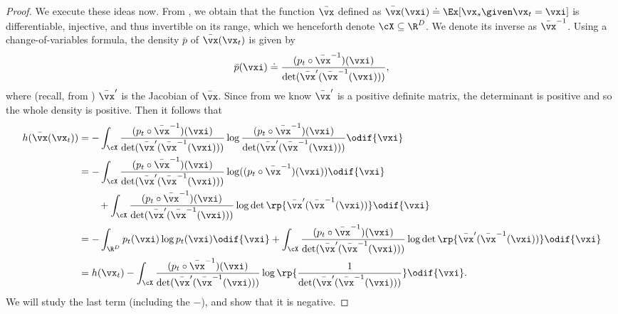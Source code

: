 \documentclass[../../book-main.tex]{subfiles}
\begin{document}
\begin{proof}
    We execute these ideas now. From , we obtain that the function \(\bar{\vx}\) defined as \(\bar{\vx}(\vxi) \doteq \Ex[\vx_{s} \given \vx_{t} = \vxi]\) is differentiable, injective, and thus invertible on its range, which we henceforth denote \(\cX \subseteq \R^{D}\). We denote its inverse as \(\bar{\vx}^{-1}\). Using a change-of-variables formula, the density \(\bar{p}\) of \(\bar{\vx}(\vx_{t})\) is given by 
    \begin{equation}
        \bar{p}(\vxi) \doteq \frac{(p_{t} \circ \bar{\vx}^{-1})(\vxi)}{\det(\bar{\vx}^{\prime}(\bar{\vx}^{-1}(\vxi)))},
    \end{equation}
    where (recall, from ) \(\bar{\vx}^{\prime}\) is the Jacobian of \(\bar{\vx}\). Since from  we know \(\bar{\vx}^{\prime}\) is a positive definite matrix, the determinant is positive and so the whole density is positive. Then it follows that 
    \begin{align}
        h(\bar{\vx}(\vx_{t}))
        &= -\int_{\cX}\frac{(p_{t} \circ \bar{\vx}^{-1})(\vxi)}{\det(\bar{\vx}^{\prime}(\bar{\vx}^{-1}(\vxi)))} \log \frac{(p_{t} \circ \bar{\vx}^{-1})(\vxi)}{\det(\bar{\vx}^{\prime}(\bar{\vx}^{-1}(\vxi)))} \odif{\vxi} \\ 
        &= -\int_{\cX}\frac{(p_{t} \circ \bar{\vx}^{-1})(\vxi)}{\det(\bar{\vx}^{\prime}(\bar{\vx}^{-1}(\vxi)))} \log((p_{t} \circ \bar{\vx}^{-1})(\vxi))\odif{\vxi} \\ 
        &\qquad + \int_{\cX}\frac{(p_{t} \circ
        \bar{\vx}^{-1})(\vxi)}{\det(\bar{\vx}^{\prime}(\bar{\vx}^{-1}(\vxi)))}\log\det\rp{\bar{\vx}^{\prime}(\bar{\vx}^{-1}(\vxi))}\odif{\vxi} \\ 
        &= -\int_{\R^{D}}p_{t}(\vxi)\log p_{t}(\vxi)\odif{\vxi}
        + \int_{\cX}\frac{(p_{t} \circ
        \bar{\vx}^{-1})(\vxi)}{\det(\bar{\vx}^{\prime}(\bar{\vx}^{-1}(\vxi)))}\log\det\rp{\bar{\vx}^{\prime}(\bar{\vx}^{-1}(\vxi))}\odif{\vxi} \\ 
        &= h(\vx_{t}) - \int_{\cX}\frac{(p_{t} \circ \bar{\vx}^{-1})(\vxi)}{\det(\bar{\vx}^{\prime}(\bar{\vx}^{-1}(\vxi)))}\log\rp{\frac{1}{\det(\bar{\vx}^{\prime}(\bar{\vx}^{-1}(\vxi)))}}\odif{\vxi}.
    \end{align}
    We will study the last term (including the \(-\)), and show that it is negative.


\end{proof}
\end{document}
